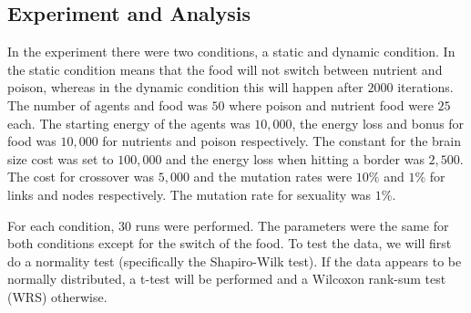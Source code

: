 \subsection{Experiment and Analysis}
In the experiment there were two conditions, a static and dynamic condition.
In the static condition means that the food will not switch between nutrient and poison, whereas in the dynamic condition this will happen after $2000$ iterations.
The number of agents and food was $50$ where poison and nutrient food were $25$ each.
The starting energy of the agents was $10,000$, the energy loss and bonus for food was $10,000$ for nutrients and poison respectively.
The constant for the brain size cost was set to $100,000$ and the energy loss when hitting a border was $2,500$.
The cost for crossover was $5,000$ and the mutation rates were $10\%$ and $1\%$ for links and nodes respectively.
The mutation rate for sexuality was $1\%$.

For each condition, $30$ runs were performed.
The parameters were the same for both conditions except for the switch of the food.
To test the data, we will first do a normality test (specifically the Shapiro-Wilk test).
If the data appears to be normally distributed, a t-test will be performed and a Wilcoxon rank-sum test (WRS) otherwise.